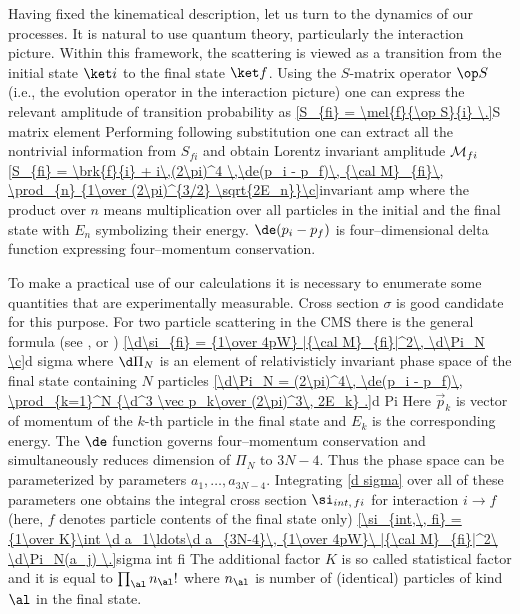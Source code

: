 Having fixed the kinematical description, let us turn to the dynamics of our processes. It is natural to use quantum theory, particularly the interaction picture. Within this framework, the scattering is viewed as a transition from the initial state $\ket i$ to the final state $\ket f$. Using the $S$-matrix operator $\op S$ (i.e., the evolution operator in the interaction picture) one can express the relevant amplitude of transition probability as 
\eqref{S_{fi} = \mel{f}{\op S}{i} \.}{S matrix element}
Performing following substitution one can extract all the nontrivial information from $S_{fi}$ and obtain Lorentz invariant amplitude ${\cal M}_{fi}$
\eqref{S_{fi} = \brk{f}{i} + i\,(2\pi)^4 \,\de(p_i - p_f)\, {\cal M}_{fi}\, \prod_{n} {1\over (2\pi)^{3/2} \sqrt{2E_n}}\c}{invariant amp}
where the product over $n$ means multiplication over all particles in the initial and the final state with $E_n$ symbolizing their energy. $\de(p_i - p_f)$ is four--dimensional delta function expressing four--momentum conservation. 

To make a practical use of our calculations it is necessary to enumerate some quantities that are experimentally measurable. Cross section $\sigma$ is good candidate for this purpose. For two particle scattering in the CMS there is the general formula (see \rfs{} ,  or )
\eqref{\d\si_{fi} = {1\over 4pW} |{\cal M}_{fi}|^2\, \d\Pi_N \c}{d sigma}
where $\d\Pi_N$ is an element of relativisticly invariant phase space of the final state containing $N$ particles
\eqref{\d\Pi_N = (2\pi)^4\, \de(p_i - p_f)\, \prod_{k=1}^N {\d^3 \vec p_k\over (2\pi)^3\, 2E_k} .}{d Pi}
Here $\vec p_k$ is vector of momentum of the $k$-th particle in the final state and $E_k$ is the corresponding energy. The $\de$ function governs four--momentum conservation and simultaneously reduces dimension of $\Pi_N$ to $3N - 4$. Thus the phase space can be parameterized by parameters $a_1,\ldots, a_{3N-4}$. Integrating \equ{} \ref{d sigma} over all of these parameters one obtains the integral cross section $\si_{int,\, fi}$ for interaction $i\rightarrow f$ (here, $f$ denotes particle contents of the final state only)
\eqref{\si_{int,\, fi} = {1\over K}\int \d a_1\ldots\d a_{3N-4}\,  {1\over 4pW}\  |{\cal M}_{fi}|^2\  \d\Pi_N(a_j) \.}{sigma int fi}
The additional factor $K$ is so called statistical factor and it is equal to $\prod_\al n_\al!$ where $n_\al$ is number of (identical) particles of kind $\al$ in the final state.

